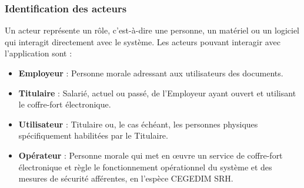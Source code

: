 

\subsubsection{Identification des acteurs}
Un acteur représente un rôle, c'est-à-dire une personne, un matériel ou un logiciel qui interagit directement avec le système. Les acteurs pouvant interagir avec l’application sont :
\begin{itemize}
    \item \textbf{Employeur} : Personne morale adressant aux utilisateurs des documents.
    \item \textbf{Titulaire} : Salarié, actuel ou passé, de l’Employeur ayant ouvert et utilisant le coffre-fort électronique.
    \item \textbf{Utilisateur} : Titulaire ou, le cas échéant, les personnes physiques spécifiquement habilitées par le Titulaire.
    \item \textbf{Opérateur} : Personne morale qui met en œuvre un service de coffre-fort électronique et règle le fonctionnement opérationnel du système et des mesures de sécurité afférentes, en l’espèce CEGEDIM SRH. 
\end{itemize}

